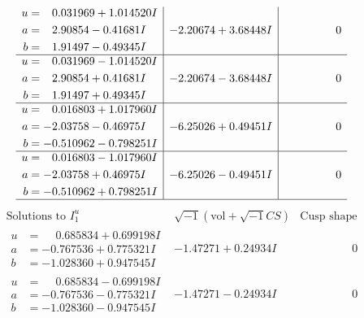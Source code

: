\documentclass[1p]{elsarticle_modified}
\theoremstyle{definition}
\newcommand{\I}{\sqrt{-1}}
\begin{document}
$$\begin{array}{c|c|c}
\begin{aligned}
u &= \phantom{-}0.031969 + 1.014520 I \\
a &= \phantom{-}2.90854 - 0.41681 I \\
b &= \phantom{-}1.91497 - 0.49345 I\end{aligned}
 & -2.20674 + 3.68448 I & \phantom{-0.000000 } 0 \\ \hline\begin{aligned}
u &= \phantom{-}0.031969 - 1.014520 I \\
a &= \phantom{-}2.90854 + 0.41681 I \\
b &= \phantom{-}1.91497 + 0.49345 I\end{aligned}
 & -2.20674 - 3.68448 I & \phantom{-0.000000 } 0 \\ \hline\begin{aligned}
u &= \phantom{-}0.016803 + 1.017960 I \\
a &= -2.03758 - 0.46975 I \\
b &= -0.510962 - 0.798251 I\end{aligned}
 & -6.25026 + 0.49451 I & \phantom{-0.000000 } 0 \\ \hline\begin{aligned}
u &= \phantom{-}0.016803 - 1.017960 I \\
a &= -2.03758 + 0.46975 I \\
b &= -0.510962 + 0.798251 I\end{aligned}
 & -6.25026 - 0.49451 I & \phantom{-0.000000 } 0\\
 \hline 
 \end{array}$$\newpage$$\begin{array}{c|c|c}  
\text{Solutions to }I^u_{1}& \I (\text{vol} + \sqrt{-1}CS) & \text{Cusp shape}\\
 \hline 
\begin{aligned}
u &= \phantom{-}0.685834 + 0.699198 I \\
a &= -0.767536 + 0.775321 I \\
b &= -1.028360 + 0.947545 I\end{aligned}
 & -1.47271 + 0.24934 I & \phantom{-0.000000 } 0 \\ \hline\begin{aligned}
u &= \phantom{-}0.685834 - 0.699198 I \\
a &= -0.767536 - 0.775321 I \\
b &= -1.028360 - 0.947545 I\end{aligned}
 & -1.47271 - 0.24934 I & \phantom{-0.000000 } 0 \\ \hline\begin{aligned}

\end{aligned}
\end{array}$$
\end{document}
